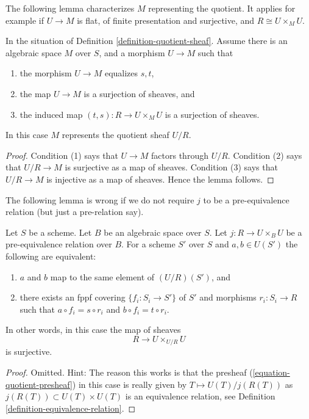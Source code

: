 \medskip\noindent
The following lemma characterizes $M$ representing the quotient.
It applies for example if $U \to M$ is flat,
of finite presentation and surjective, and $R \cong U \times_M U$.

\begin{lemma}
\label{lemma-criterion-quotient-representable}
In the situation of Definition \ref{definition-quotient-sheaf}.
Assume there is an algebraic space $M$ over $S$,
and a morphism $U \to M$ such that
\begin{enumerate}
\item the morphism $U \to M$ equalizes $s, t$,
\item the map $U \to M$ is a surjection of sheaves, and
\item the induced map $(t, s) : R \to U \times_M U$ is a
surjection of sheaves.
\end{enumerate}
In this case $M$ represents the quotient sheaf $U/R$.
\end{lemma}

\begin{proof}
Condition (1) says that $U \to M$ factors through $U/R$.
Condition (2) says that $U/R \to M$ is surjective as a map of sheaves.
Condition (3) says that $U/R \to M$ is injective as a map of sheaves.
Hence the lemma follows.
\end{proof}

\noindent
The following lemma is wrong if we do not require $j$ to be a
pre-equivalence relation (but just a pre-relation say).

\begin{lemma}
\label{lemma-quotient-pre-equivalence}
Let $S$ be a scheme. Let $B$ be an algebraic space over $S$.
Let $j : R \to U \times_B U$ be a pre-equivalence relation over $B$.
For a scheme $S'$ over $S$ and $a, b \in U(S')$ the following are equivalent:
\begin{enumerate}
\item $a$ and $b$ map to the same element of $(U/R)(S')$, and
\item there exists an fppf covering $\{f_i : S_i \to S'\}$ of $S'$
and morphisms $r_i : S_i \to R$ such that
$a \circ f_i = s \circ r_i$ and $b \circ f_i = t \circ r_i$.
\end{enumerate}
In other words, in this case the map of sheaves
$$
R \longrightarrow U \times_{U/R} U
$$
is surjective.
\end{lemma}

\begin{proof}
Omitted. Hint: The reason this works is that the presheaf
(\ref{equation-quotient-presheaf}) in this case is really given
by $T \mapsto U(T)/j(R(T))$ as $j(R(T)) \subset U(T) \times U(T)$
is an equivalence relation, see
Definition \ref{definition-equivalence-relation}.
\end{proof}

